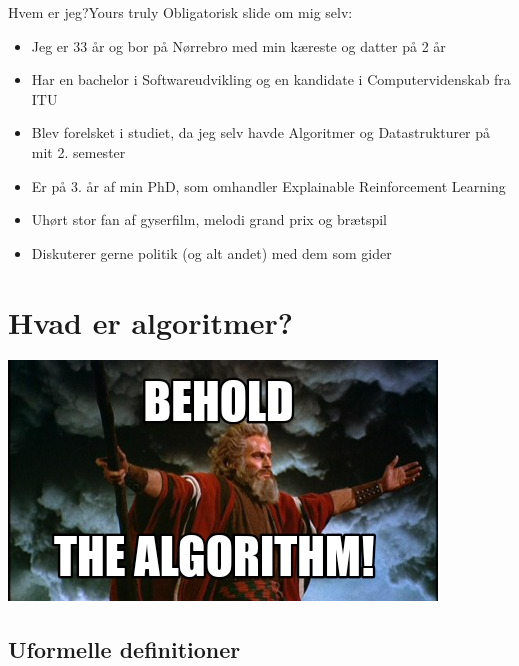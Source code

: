 \documentclass{beamer}
\begin{document}
\begin{frame}{Hvem er jeg?}{Yours truly}
    Obligatorisk slide om mig selv:

    \begin{itemize}[<+->]
        \item Jeg er 33 år og bor på Nørrebro med min kæreste og datter på 2 år
        \item Har en bachelor i Softwareudvikling og en kandidate i
            Computervidenskab fra ITU
        \item Blev forelsket i studiet, da jeg selv havde Algoritmer og
            Datastrukturer på mit 2. semester
        \item Er på 3. år af min PhD, som omhandler Explainable Reinforcement
            Learning
        \item Uhørt stor fan af gyserfilm, melodi grand prix og brætspil
        \item Diskuterer gerne politik (og alt andet) med dem som gider
    \end{itemize}
\end{frame}



\section{Hvad er algoritmer?}%

\begin{frame}{}{}
    \includegraphics[width=\textwidth]{behold-the-algorithm}
\end{frame}



\subsection{Uformelle definitioner}
\end{document}
